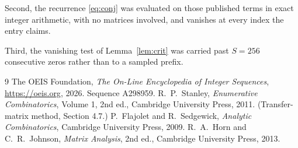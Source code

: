 \documentclass[11pt,a4paper]{article}
\theoremstyle{plain}
\theoremstyle{definition}
\begin{document}
Second, the recurrence \eqref{eq:conj} was evaluated on those published terms in exact
integer arithmetic, with no matrices involved, and vanishes at every index the entry claims.

Third, the vanishing test of Lemma~\ref{lem:crit} was carried past $S=256$ consecutive
zeros rather than to a sampled prefix.

\begin{thebibliography}{9}
 The OEIS Foundation, \emph{The On-Line Encyclopedia of Integer
Sequences}, \url{https://oeis.org}, 2026. Sequence A298959.
 R.~P.~Stanley, \emph{Enumerative Combinatorics}, Volume 1, 2nd ed.,
Cambridge University Press, 2011. (Transfer-matrix method, Section 4.7.)
 P.~Flajolet and R.~Sedgewick, \emph{Analytic Combinatorics}, Cambridge
University Press, 2009.
 R.~A.~Horn and C.~R.~Johnson, \emph{Matrix Analysis}, 2nd ed., Cambridge
University Press, 2013.
\end{thebibliography}
\end{document}
